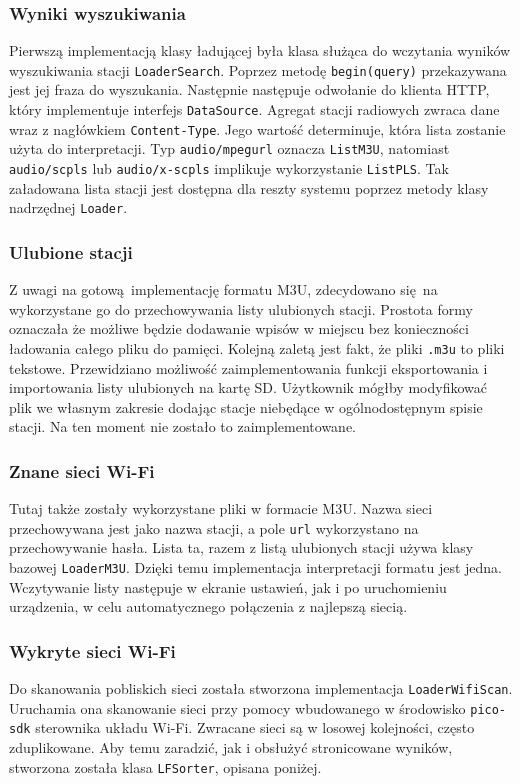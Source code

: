 \documentclass[polish]{aghengthesis}
\begin{document}
			\subsubsection{Wyniki wyszukiwania}
				Pierwszą implementacją klasy ładującej była klasa służąca do wczytania wyników wyszukiwania stacji \lstinline|LoaderSearch|. Poprzez metodę \lstinline|begin(query)| przekazywana jest jej fraza do wyszukania. Następnie następuje odwołanie do klienta HTTP, który implementuje interfejs \lstinline|DataSource|. Agregat stacji radiowych zwraca dane wraz z nagłówkiem \lstinline|Content-Type|. Jego wartość determinuje, która lista zostanie użyta do interpretacji. Typ \lstinline|audio/mpegurl| oznacza \lstinline|ListM3U|, natomiast \lstinline|audio/scpls| lub \lstinline|audio/x-scpls| implikuje wykorzystanie \lstinline|ListPLS|. Tak załadowana lista stacji jest dostępna dla reszty systemu poprzez metody klasy nadrzędnej \lstinline|Loader|.
			
			\subsubsection{Ulubione stacji}
				Z uwagi na gotową implementację formatu M3U, zdecydowano się na wykorzystane go do przechowywania listy ulubionych stacji. Prostota formy oznaczała że możliwe będzie dodawanie wpisów w miejscu bez konieczności ładowania całego pliku do pamięci. Kolejną zaletą jest fakt, że pliki \lstinline|.m3u| to pliki tekstowe. Przewidziano możliwość zaimplementowania funkcji eksportowania i importowania listy ulubionych na kartę SD. Użytkownik mógłby modyfikować plik we własnym zakresie dodając stacje niebędące w ogólnodostępnym spisie stacji. Na ten moment nie zostało to zaimplementowane.

			\subsubsection{Znane sieci Wi-Fi}
				Tutaj także zostały wykorzystane pliki w formacie M3U. Nazwa sieci przechowywana jest jako nazwa stacji, a pole \lstinline|url| wykorzystano na przechowywanie hasła. Lista ta, razem z listą ulubionych stacji używa klasy bazowej \lstinline|LoaderM3U|. Dzięki temu implementacja interpretacji formatu jest jedna. Wczytywanie listy następuje w ekranie ustawień, jak i po uruchomieniu urządzenia, w celu automatycznego połączenia z najlepszą siecią.
				
			\subsubsection{Wykryte sieci Wi-Fi}
				Do skanowania pobliskich sieci została stworzona implementacja \lstinline|LoaderWifiScan|. Uruchamia ona skanowanie sieci przy pomocy wbudowanego w środowisko \lstinline|pico-sdk| sterownika układu Wi-Fi. Zwracane sieci są w losowej kolejności, często zduplikowane. Aby temu zaradzić, jak i obsłużyć stronicowane wyników, stworzona została klasa \lstinline|LFSorter|, opisana poniżej.
				
\end{document}
